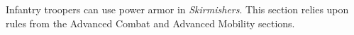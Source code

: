 Infantry troopers can use power armor in \emph{Skirmishers}.
This section relies upon rules from the Advanced Combat and Advanced Mobility sections.
